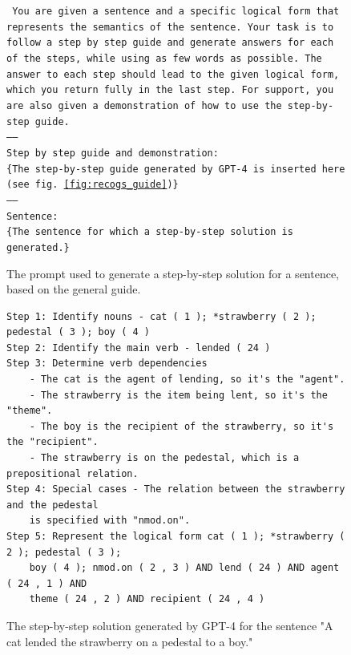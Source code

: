 \documentclass[11pt]{article}
\begin{document}
    \begin{figure}
        \small
        \texttt{
            You are given a sentence and a specific logical form that represents the semantics of the sentence.
            Your task is to follow a step by step guide and generate answers for each of the steps,
            while using as few words as possible.
            The answer to each step should lead to the given logical form, which you return fully in the last step.
            For support, you are also given a demonstration of how to use the step-by-step guide.\\
            -----\\
            Step by step guide and demonstration:\\
            {\color{red}\{The step-by-step guide generated by GPT-4 is inserted here (see fig. \ref{fig:recogs_guide})\}}\\
            -----\\
            Sentence:\\
            {\color{red}\{The sentence for which a step-by-step solution is generated.\}}
        }
        \caption{The prompt used to generate a step-by-step solution for a sentence, based on the general guide.}
        \label{fig:prompt_generate_cot_solution}
    \end{figure}

    \begin{figure}
        \small
        \begin{verbatim}
Step 1: Identify nouns - cat ( 1 ); *strawberry ( 2 ); pedestal ( 3 ); boy ( 4 )
Step 2: Identify the main verb - lended ( 24 )
Step 3: Determine verb dependencies
    - The cat is the agent of lending, so it's the "agent".
    - The strawberry is the item being lent, so it's the "theme".
    - The boy is the recipient of the strawberry, so it's the "recipient".
    - The strawberry is on the pedestal, which is a prepositional relation.
Step 4: Special cases - The relation between the strawberry and the pedestal
    is specified with "nmod.on".
Step 5: Represent the logical form cat ( 1 ); *strawberry ( 2 ); pedestal ( 3 );
    boy ( 4 ); nmod.on ( 2 , 3 ) AND lend ( 24 ) AND agent ( 24 , 1 ) AND
    theme ( 24 , 2 ) AND recipient ( 24 , 4 )
        \end{verbatim}
        \caption{The step-by-step solution generated by GPT-4 for the sentence
        "A cat lended the strawberry on a pedestal to a boy."}
        \label{fig:gpt4_guide}
    \end{figure}
\end{document}
